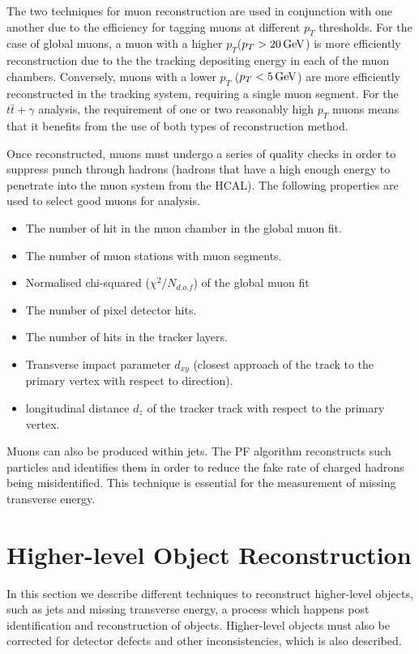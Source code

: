 The two techniques for muon reconstruction are used in conjunction with one another due to the efficiency for tagging muons at different $p_T$ thresholds. For the case of global muons, a muon with a higher $p_T$($p_T > 20 \,\text{Ge\hspace{-.08em}V}$) is more efficiently reconstruction due to the the tracking depositing energy in each of the muon chambers. Conversely, muons with a lower $p_T$ ($p_T < 5 \,\text{Ge\hspace{-.08em}V}$) are more efficiently reconstructed in the tracking system, requiring a single muon segment. For the $t\bar{t}+\gamma$ analysis, the requirement of one or two reasonably high $p_T$ muons means that it benefits from the use of both types of reconstruction method.

Once reconstructed, muons must undergo a series of quality checks in order to suppress punch through hadrons (hadrons that have a high enough energy to penetrate into the muon system from the HCAL). The following properties are used to select good muons for analysis.

\begin{itemize}
	\item The number of hit in the muon chamber in the global muon fit.
	\item The number of muon stations with muon segments.
	\item Normalised chi-squared ($\chi^2/N_{d.o.f}$) of the global muon fit
	\item The number of pixel detector hits.
	\item The number of hits in the tracker layers.
	\item Transverse impact parameter $d_{xy}$ (closest approach of the track to the primary vertex with respect to direction).
	\item longitudinal distance $d_z$ of the tracker track with respect to the primary vertex.
\end{itemize}

Muons can also be produced within jets. The PF algorithm reconstructs such particles and identifies them in order to reduce the fake rate of charged hadrons being misidentified. This technique is essential for the measurement of missing transverse energy. 

\section{Higher-level Object Reconstruction} \label{sec-HigherLevelObjects}

In this section we describe different techniques to reconstruct higher-level objects, such as jets and missing transverse energy, a process which happens post identification and reconstruction of objects. Higher-level objects must also be corrected for detector defects and other inconsistencies, which is also described.

